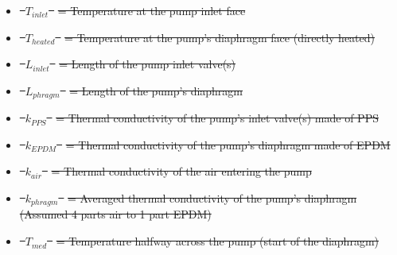 \documentclass[a4paper,12pt,twoside]{article}
\providecommand{\DIFdeltex}[1]{{\protect\color{red}\sout{#1}}}                      %
\providecommand{\DIFdelbegin}{} %
\providecommand{\DIFdel}[1]{\texorpdfstring{\DIFdeltex{#1}}{}} %
\newcommand{\DIFscaledelfig}{0.5}
\newlength{\DIFdelgraphicswidth} %
\newlength{\DIFdelgraphicsheight} %
\newcommand{\DIFdelincludegraphics}[2][]{%
\sbox{\DIFdelgraphicsbox}{\DIFOincludegraphics[#1]{#2}}%
\settoboxwidth{\DIFdelgraphicswidth}{\DIFdelgraphicsbox} %
\settoboxtotalheight{\DIFdelgraphicsheight}{\DIFdelgraphicsbox} %
\scalebox{\DIFscaledelfig}{%
\parbox[b]{\DIFdelgraphicswidth}{\usebox{\DIFdelgraphicsbox}\\[-\baselineskip] \rule{\DIFdelgraphicswidth}{0em}}\llap{\resizebox{\DIFdelgraphicswidth}{\DIFdelgraphicsheight}{%
\setlength{\unitlength}{\DIFdelgraphicswidth}%
\begin{picture}(1,1)%
\thicklines\linethickness{2pt} %
{\color[rgb]{1,0,0}\put(0,0){\framebox(1,1){}}}%
{\color[rgb]{1,0,0}\put(0,0){\line( 1,1){1}}}%
{\color[rgb]{1,0,0}\put(0,1){\line(1,-1){1}}}%
\end{picture}%
}\hspace*{3pt}}} %
} %
\DeclareRobustCommand{\DIFdelbegin}{\DIFOdelbegin \let\includegraphics\DIFdelincludegraphics} %
\begin{document}
\DIFdelbegin %
\begin{itemize}%
\item%
\DIFdel{\mbox{%
$T_{inlet}$
}%
}%
\DIFdel{= Temperature at the pump inlet face
    }%
\item%
\DIFdel{\mbox{%
$T_{heated}$
}%
}%
\DIFdel{= Temperature at the pump's diaphragm face (directly heated)
    }%
\item%
\DIFdel{\mbox{%
$L_{inlet}$
}%
}%
\DIFdel{= Length of the pump inlet valve(s)
    }%
\item%
\DIFdel{\mbox{%
$L_{phragm}$
}%
}%
\DIFdel{= Length of the pump's diaphragm
    }%
\item%
\DIFdel{\mbox{%
$k_{PPS}$
}%
}%
\DIFdel{= Thermal conductivity of the pump's inlet valve(s) made of PPS
    }%
\item%
\DIFdel{\mbox{%
$k_{EPDM}$
}%
}%
\DIFdel{= Thermal conductivity of the pump's diaphragm made of EPDM
    }%
\item%
\DIFdel{\mbox{%
$k_{air}$
}%
}%
\DIFdel{= Thermal conductivity of the air entering the pump
    }%
\item%
\DIFdel{\mbox{%
$k_{phragm}$
}%
}%
\DIFdel{=  Averaged thermal conductivity of the pump's diaphragm (Assumed 4 parts air to 1 part EPDM)
    }%
\item%
\DIFdel{\mbox{%
$T_{med}$
}%
}%
\DIFdel{= Temperature halfway across the pump (start of the diaphragm)
}
\end{itemize}%
\end{document}
